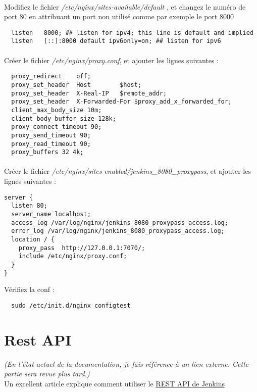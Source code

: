 \documentclass{article}
\begin{document}
\paragraph{}Modifiez le fichier \textit{/etc/nginx/sites-available/default
}, et changez le numéro de port 80 en attribuant un port non utilisé comme par exemple le port 8000
\begin{verbatim}
  listen   8000; ## listen for ipv4; this line is default and implied
  listen   [::]:8000 default ipv6only=on; ## listen for ipv6
\end{verbatim}

\paragraph{}Créer le fichier \textit{/etc/nginx/proxy.conf}, et ajouter les lignes suivantes :
\begin{verbatim}
  proxy_redirect 	off;
  proxy_set_header 	Host 		$host;
  proxy_set_header 	X-Real-IP 	$remote_addr;
  proxy_set_header 	X-Forwarded-For $proxy_add_x_forwarded_for;
  client_max_body_size 10m;
  client_body_buffer_size 128k;
  proxy_connect_timeout 90;
  proxy_send_timeout 90;
  proxy_read_timeout 90;
  proxy_buffers 32 4k;
\end{verbatim}

\paragraph{}Créer le fichier \textit{/etc/nginx/sites-enabled/jenkins\_8080\_proxypass}, et ajouter les lignes suivantes :
\begin{verbatim}
server {
  listen 80;
  server_name localhost;
  access_log /var/log/nginx/jenkins_8080_proxypass_access.log;
  error_log /var/log/nginx/jenkins_8080_proxypass_access.log;
  location / {
    proxy_pass  http://127.0.0.1:7070/;
    include /etc/nginx/proxy.conf;
  }
}
\end{verbatim}

Vérifiez la conf : 
\begin{verbatim}
  sudo /etc/init.d/nginx configtest
\end{verbatim}


\newpage
\section{Rest API}\label{Rest API}
\textit{(En l'état actuel de la documentation, je fais référence à un lien externe. Cette partie sera revue plus tard.)}\\
Un excellent article explique comment utiliser le \href{http://Mister-tie.fr/blog/2014/03/13/debuter-avec-lapi-rest-de-jenkins/}{REST API de Jenkins}
\end{document}
